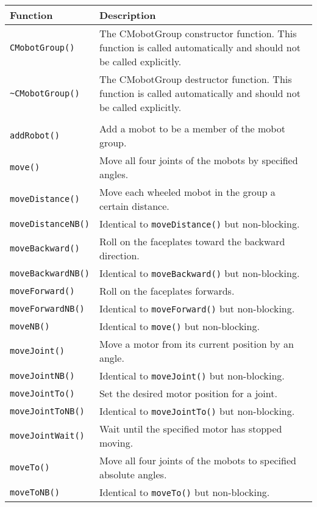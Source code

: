 \begin{tabular}{p{1.75in}p{4.5in}}
\hline
Function & Description \\
\hline
\texttt{CMobotGroup()} & The CMobotGroup constructor function. This function
is called automatically and should not be called explicitly. \\
\texttt{\textasciitilde CMobotGroup()} & The CMobotGroup destructor function. This function
is called automatically and should not be called explicitly. \\
& \\
\texttt{addRobot()} & Add a mobot to be a member of the mobot group. \\
\texttt{move()} & Move all four joints of the mobots by specified angles. \\
\texttt{moveDistance()}  & Move each wheeled mobot in the group a certain distance. \\
\texttt{moveDistanceNB()}  & Identical to \texttt{moveDistance()} but non-blocking. \\
\texttt{moveBackward()}  & Roll on the faceplates toward the backward direction. \\
\texttt{moveBackwardNB()}  & Identical to \texttt{moveBackward()} but non-blocking. \\
\texttt{moveForward()}  & Roll on the faceplates forwards. \\
\texttt{moveForwardNB()}  & Identical to \texttt{moveForward()} but non-blocking. \\
\texttt{moveNB()} & Identical to \texttt{move()} but non-blocking. \\
\texttt{moveJoint()} & Move a motor from its current position by an angle. \\
\texttt{moveJointNB()} & Identical to \texttt{moveJoint()} but non-blocking. \\
\texttt{moveJointTo()} & Set the desired motor position for a joint. \\
\texttt{moveJointToNB()} & Identical to \texttt{moveJointTo()} but non-blocking. \\
\texttt{moveJointWait()} & Wait until the specified motor has stopped moving. \\
\texttt{moveTo()} & Move all four joints of the mobots to specified absolute angles. \\
\texttt{moveToNB()} & Identical to \texttt{moveTo()} but non-blocking. \\

\end{tabular}
